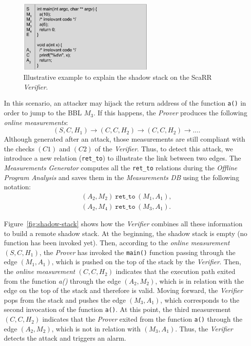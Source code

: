 \begin{figure}
	\centering
	\includegraphics[width=0.6\textwidth]{fig_c4/trace-paths-example.pdf}
	\caption[ScaRR shadow stack example.]{Illustrative example to explain the 
	shadow 
	stack on the ScaRR 
	\emph{Verifier}.}
	\label{fig:trace-paths}
\end{figure}

In this scenario, an attacker may hijack the return address of the function 
\texttt{a()} in order to jump to the BBL $M_3$.
If this happens, the \emph{Prover} produces the following \emph{online 
measurements}:
$$
(S,C,H_1) \rightarrow (C,C,H_2) \rightarrow (C,C,H_2) \rightarrow \dots.
$$
Although generated after an attack, those measurements are still compliant with 
the checks $(C1)$ and $(C2)$ of the \emph{Verifier}. Thus, to detect this 
attack, we introduce a new relation (\ie \texttt{ret\_to}) to illustrate the 
link between two edges. The \emph{Measurements Generator} computes all the 
\texttt{ret\_to} relations during the \emph{Offline Program Analysis} and saves 
them in the \emph{Measurements DB} using the following notation:
\begin{align*}
(A_2,M_2)~\texttt{ret\_to}~(M_1,A_1), \\
(A_2,M_4)~\texttt{ret\_to}~(M_3,A_1).
\end{align*}

Figure~\ref{fig:shadow-stack} shows how the \emph{Verifier} combines all these 
information to build a remote shadow stack.
At the beginning, the shadow stack is empty (\ie no function has been invoked 
yet). Then, according to the \emph{online measurement} $(S,C,H_1)$, the 
\emph{Prover} has invoked the \texttt{main()} function passing through the edge 
$(M_1,A_1)$, which is pushed on the top of the stack by the \emph{Verifier}. 
Then, the \emph{online measurement} $(C,C,H_2)$ indicates that the execution 
path exited from the function \emph{a()} through the edge $(A_2,M_2)$, which is 
in relation with the edge on the  top of the stack and therefore is valid.
Moving forward, the \emph{Verifier} pops from the stack and pushes the edge 
$(M_3,A_1)$, which corresponds to the second invocation of the function 
\texttt{a()}.
At this point, the third measurement $(C,C,H_2)$ indicates that the 
\emph{Prover} exited from the function \texttt{a()}
through the edge $(A_2,M_2)$, which is not in relation with $(M_3,A_1)$. Thus, 
the  \emph{Verifier} detects the attack and triggers an alarm. 

